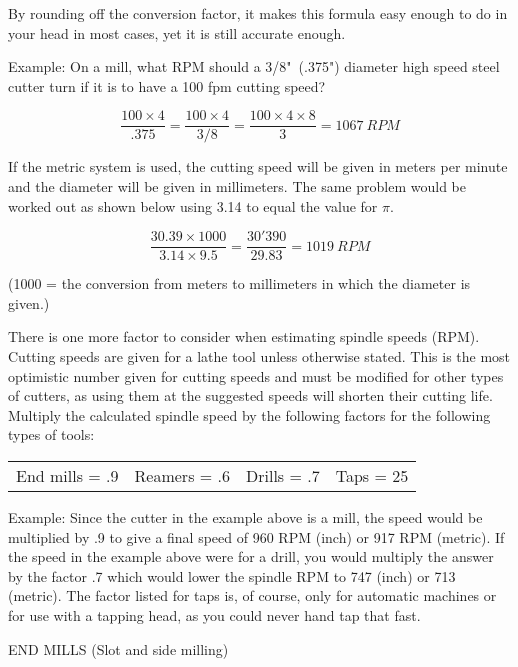 By rounding off the conversion factor, it makes this formula easy enough to do
in your head in most cases, yet it is still accurate enough.

Example: On a mill, what RPM should a 3/8"\ (.375") diameter high speed steel
cutter turn if it is to have a 100 fpm cutting speed?

$$\frac{100 \times 4}{.375} = \frac{100 \times 4}{3/8}=
\frac{100 \times 4 \times 8}{3}=1067\ RPM$$

If the metric system is used, the cutting speed will be given in meters per
minute and the diameter will be given in millimeters. The same problem would be
worked out as shown below using 3.14 to equal the value for $\pi$.

$$
\frac{30.39 \times 1000}{3.14 \times 9.5}=
\frac{30'390}{29.83}=
1019\ RPM
$$

(1000 = the conversion from meters to millimeters in which the diameter is
given.)


There is one more factor to consider when estimating spindle speeds (RPM).
Cutting speeds are given for a lathe tool unless otherwise stated. This is the
most optimistic number given for cutting speeds and must be modified for other
types of cutters, as using them at the suggested speeds will shorten their
cutting life. Multiply the calculated spindle speed by the following factors for
the following types of tools:

\bigskip
\begin{tabular}{l l l l}
End mills = .9 &             
Reamers = .6 &
Drills = .7  &                
Taps = 25 \\
\end{tabular}
\bigskip

Example: Since the cutter in the example above is a mill, the speed would be
multiplied by .9 to give a final speed of 960 RPM (inch) or 917 RPM (metric). If
the speed in the example above were for a drill, you would multiply the answer
by the factor .7 which would lower the spindle RPM to 747 (inch) or 713
(metric). The factor listed for taps is, of course, only for automatic machines
or for use with a tapping head, as you could never hand tap that fast.

\bigskip

END MILLS (Slot and side milling)

\bigskip

